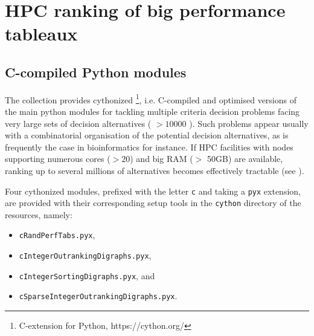 \chapter{HPC ranking of big performance tableaux}
\label{sec:11}



\section{C-compiled Python modules}
\label{sec:11.1}

The \Digraph collection provides cythonized \footnote{\Cython C-extension for Python, https://cython.org/}, i.e. C-compiled and optimised versions of the main python modules for tackling multiple criteria decision problems facing very large sets of decision alternatives ( $> 10000$ ). Such problems appear usually with a combinatorial organisation of the potential decision alternatives, as is frequently the case in bioinformatics for instance. If HPC facilities with nodes supporting numerous cores ($> 20$) and big RAM ($>$ 50GB) are available, ranking up to several millions of alternatives becomes effectively tractable (see \citep{BIS-2016}).

Four cythonized \Digraph modules, prefixed with the letter \texttt{c} and taking a \texttt{pyx} extension, are provided with their corresponding setup tools in the \texttt{cython} directory of the \Digraph resources, namely:
\begin{itemize}[topsep=1pt]
\item[] \texttt{cRandPerfTabs.pyx},
\item[] \texttt{cIntegerOutrankingDigraphs.pyx},
\item[] \texttt{cIntegerSortingDigraphs.pyx}, and
\item[] \texttt{cSparseIntegerOutrankingDigraphs.pyx}.
\end{itemize}

